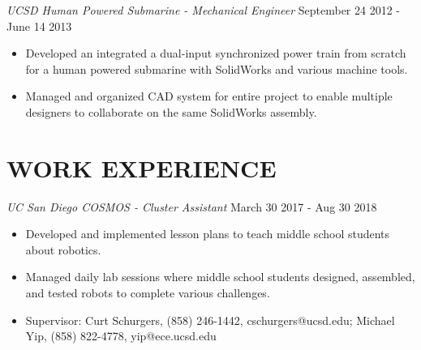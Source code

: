 \documentclass[line,margin]{res}
\begin{document}
\begin{resume}
	{\sl UCSD Human Powered Submarine - Mechanical Engineer} \hfill September 24 2012 - June 14 2013
	\begin{itemize}
		\item Developed an integrated a dual-input synchronized power train from scratch for a human powered submarine with SolidWorks and various machine tools.
		\item Managed and organized CAD system for entire project to enable multiple designers to collaborate on the same SolidWorks assembly.
	\end{itemize}


\section{WORK EXPERIENCE}
	{\sl UC San Diego COSMOS - Cluster Assistant} \hfill March 30 2017 - Aug 30 2018
	\begin{itemize}
		\item Developed and implemented lesson plans to teach middle school students about robotics.
		\item Managed daily lab sessions where middle school students designed, assembled, and tested robots to complete various challenges.
		\item Supervisor: Curt Schurgers, (858) 246-1442, cschurgers@ucsd.edu; Michael Yip, (858) 822-4778, yip@ece.ucsd.edu
	\end{itemize}


\end{resume}
\end{document}
